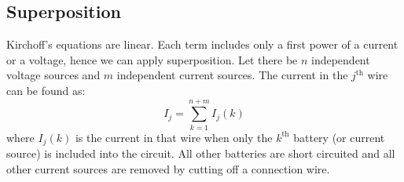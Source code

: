 \documentclass{article}
\begin{document}
    \subsection{Superposition}
    Kirchoff's equations are linear. Each term includes only a first power of a current or a voltage, hence we can apply superposition. Let there be $n$ independent voltage sources and $m$ independent current sources. The current in the $j^\text{th}$ wire can be found as:
    \begin{equation}
        I_j = \sum_{k=1}^{n+m} I_j(k)
    \end{equation}
    where $I_j(k)$ is the current in that wire when only the $k^\text{th}$ battery (or current source) is included into the circuit. All other batteries are short circuited and all other current sources are removed by cutting off a connection wire.
\end{document}
